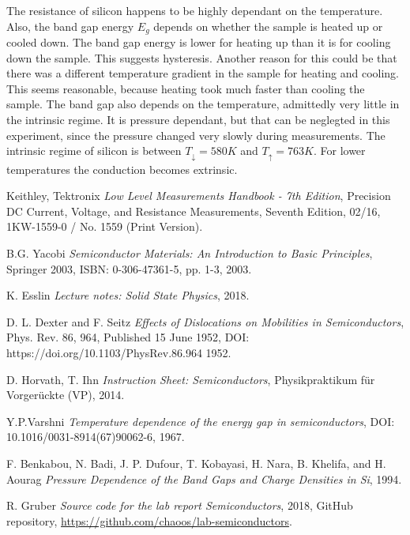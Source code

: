 \documentclass[a4paper]{article}
\begin{document}
The resistance of silicon happens to be highly dependant on the temperature. Also, the band gap energy $E_g$ depends on whether the sample is heated up or cooled down. The band gap energy is lower for heating up than it is for cooling down the sample. This suggests hysteresis. Another reason for this could be that there was a different temperature gradient in the sample for heating and cooling. This seems reasonable, because heating took much faster than cooling the sample. The band gap also depends on the temperature, admittedly very little in the intrinsic regime. It is pressure dependant, but that can be neglegted in this experiment, since the pressure changed very slowly during measurements. The intrinsic regime of silicon is between $T_{\downarrow} = 580 K$ and $T_{\uparrow} = 763 K$. For lower temperatures the conduction becomes extrinsic.

\begin{thebibliography}{9}

  Keithley, Tektronix
  \textit{Low Level Measurements Handbook - 7th Edition},
  Precision DC Current, Voltage, and Resistance Measurements,
  Seventh Edition,
  02/16,
  1KW-1559-0 / No. 1559 (Print Version).

  B.G. Yacobi
  \textit{Semiconductor Materials: An Introduction to Basic Principles},
  Springer 2003,
  ISBN: 0-306-47361-5,
  pp. 1-3,
  2003.

  K. Esslin
  \textit{Lecture notes: Solid State Physics},
  2018.

  D. L. Dexter and F. Seitz
  \textit{Effects of Dislocations on Mobilities in Semiconductors},
  Phys. Rev. 86, 964,
  Published 15 June 1952,
  DOI: https://doi.org/10.1103/PhysRev.86.964
  1952.

  D. Horvath, T. Ihn 
  \textit{Instruction Sheet: Semiconductors},
  Physikpraktikum für Vorgerückte (VP),
  2014.

  Y.P.Varshni
  \textit{Temperature dependence of the energy gap in semiconductors},
  DOI: 10.1016/0031-8914(67)90062-6,
  1967.

  F. Benkabou, N. Badi, J. P. Dufour, T. Kobayasi, H. Nara, B. Khelifa, and H. Aourag 
  \textit{Pressure Dependence of the Band Gaps and Charge Densities in Si},
  1994.

  R. Gruber
  \textit{Source code for the lab report Semiconductors},
  2018,
  GitHub repository,
  \url{https://github.com/chaoos/lab-semiconductors}.

\end{thebibliography}
\end{document}
